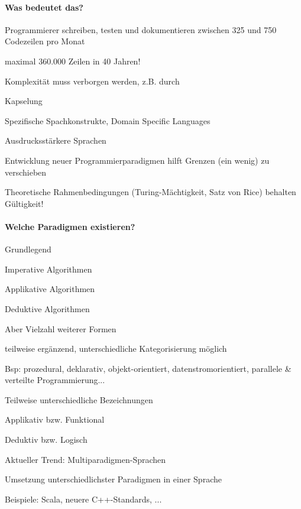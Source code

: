 \documentclass[10pt]{article}
\begin{document}
\paragraph{Was bedeutet das?}
\begin{itemize*}
  \item Programmierer schreiben, testen und dokumentieren zwischen 325 und 750 Codezeilen pro Monat
  \begin{itemize*}
    \item maximal 360.000 Zeilen in 40 Jahren!
  \end{itemize*}
  \item Komplexität muss verborgen werden, z.B. durch
  \begin{itemize*}
    \item Kapselung
    \item Spezifische Spachkonstrukte, Domain Specific Languages
    \item Ausdrucksstärkere Sprachen
  \end{itemize*}
  \item Entwicklung neuer Programmierparadigmen hilft Grenzen (ein wenig) zu verschieben
  \item Theoretische Rahmenbedingungen (Turing-Mächtigkeit, Satz von Rice) behalten Gültigkeit!
\end{itemize*}

\paragraph{Welche Paradigmen existieren?}
\begin{itemize*}
  \item Grundlegend
  \begin{itemize*}
    \item Imperative Algorithmen
    \item Applikative Algorithmen
    \item Deduktive Algorithmen
  \end{itemize*}
  \item Aber Vielzahl weiterer Formen
  \begin{itemize*}
    \item teilweise ergänzend, unterschiedliche Kategorisierung möglich
    \item Bsp: prozedural, deklarativ, objekt-orientiert, datenstromorientiert, parallele \& verteilte Programmierung...
  \end{itemize*}
  \item Teilweise unterschiedliche Bezeichnungen
  \begin{itemize*}
    \item Applikativ bzw. Funktional
    \item Deduktiv bzw. Logisch
  \end{itemize*}
  \item Aktueller Trend: Multiparadigmen-Sprachen
  \begin{itemize*}
    \item Umsetzung unterschiedlichster Paradigmen in einer Sprache
    \item Beispiele: Scala, neuere C++-Standards, ...
  \end{itemize*}
\end{itemize*}
\end{document}
